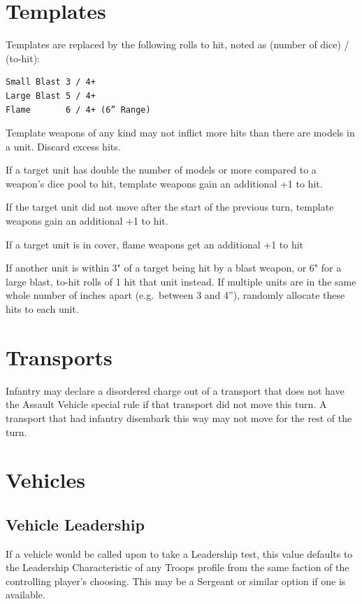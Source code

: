 \documentclass[letterpaper,twocolumn,oneside,titlepage]{book}
\begin{document}
\section{\texorpdfstring{\textbf{Templates}}{Templates}}\label{templates}

Templates are replaced by the following rolls to hit, noted as (number of dice) /
(to-hit):

\begin{verbatim}
Small Blast 3 / 4+  
Large Blast 5 / 4+  
Flame       6 / 4+ (6” Range)
\end{verbatim}

Template weapons of any kind may not inflict more hits than there are
models in a unit. Discard excess hits.

If a target unit has double the number of models or more compared to a
weapon's dice pool to hit, template weapons gain an additional +1 to
hit.

If the target unit did not move after the start of the previous turn,
template weapons gain an additional +1 to hit.

If a target unit is in cover, flame weapons get an additional +1 to hit

If another unit is within 3" of a target being hit by a blast weapon,
or 6" for a large blast, to-hit rolls of 1 hit that unit instead. If
multiple units are in the same whole number of inches apart
(e.g.~between 3 and 4''), randomly allocate these hits to each unit.

\section{\texorpdfstring{\textbf{Transports}}{Transports}}\label{transports}

Infantry may declare a disordered charge out of a transport that does
not have the Assault Vehicle special rule if that transport did not move
this turn. A transport that had infantry disembark this way may not move
for the rest of the turn.

\section{\texorpdfstring{\textbf{Vehicles}}{Vehicles}}\label{vehicles}

\subsection{\texorpdfstring{\textbf{Vehicle Leadership}}{Vehicle Leadership}}\label{vehicle-leadership}
If a vehicle would be called upon to take a Leadership test, this value defaults to the
Leadership Characteristic of any Troops profile from the same faction of the controlling player's choosing.
This may be a Sergeant or similar option if one is available.
\end{document}
